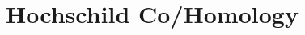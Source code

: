 \documentclass{ximera}
\title{Hochschild Co/Homology}
\begin{document}
\begin{abstract}

\end{abstract}
\maketitle

\end{document}

